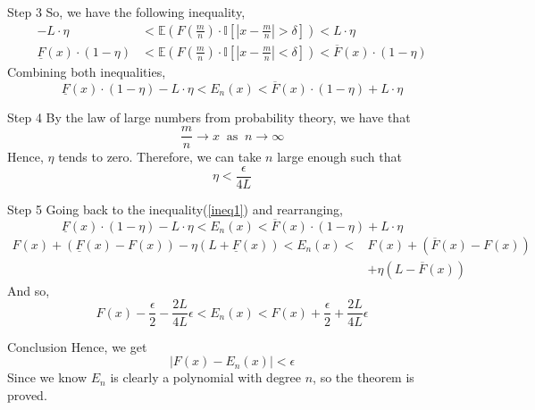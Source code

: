 \documentclass[mathserif,serif]{beamer}
\begin{document}
\begin{frame}{Step 3}
So, we have the following inequality,
\begin{align*}
    -L\cdot\eta&<\mathbb{E}\left(F\left(\frac{m}{n}\right)\cdot \mathbb{I}\left[|x-\frac{m}{n}|>\delta\right]\right)<L\cdot\eta\\
    \underline{F}(x)\cdot(1-\eta)&<\mathbb{E}\left(F\left(\frac{m}{n}\right)\cdot \mathbb{I}\left[|x-\frac{m}{n}|<\delta\right]\right)<\overline{F}(x)\cdot (1-\eta)
\end{align*}
Combining both inequalities, 
\begin{equation}\label{ineq1}
 \underline{F}(x)\cdot(1-\eta)-L\cdot\eta<E_n(x)<\overline{F}(x)\cdot (1-\eta)+L\cdot\eta 
\end{equation}
\end{frame}

\begin{frame}{Step 4}
By the law of large numbers from probability theory, we have that
\begin{equation*}
    \frac{m}{n}\longrightarrow x \;\;\text{as}\;\;n \rightarrow \infty
\end{equation*}
Hence, $\eta$ tends to zero.
\newline
Therefore, we can take $n$ large enough such that 
\begin{equation*}
\eta<\frac{\epsilon}{4L}
\end{equation*}
\end{frame}

\begin{frame}{Step 5}
Going back to the inequality(\ref{ineq1}) and rearranging,
\begin{equation*}
 \underline{F}(x)\cdot(1-\eta)-L\cdot\eta<E_n(x)<\overline{F}(x)\cdot (1-\eta)+L\cdot\eta 
\end{equation*}
\begin{align*}
    F(x)+(\underline{F}(x)-F(x))-\eta(L+\underline{F}(x))<E_n(x)< &F(x)+(\overline{F}(x)-F(x))\\
    &+\eta(L-\overline{F}(x))
\end{align*}
And so,
\begin{equation*}
    F(x)-\frac{\epsilon}{2}-\frac{2L}{4L}\epsilon<E_n(x)<F(x)+\frac{\epsilon}{2}+\frac{2L}{4L}\epsilon
\end{equation*}
\end{frame}

\begin{frame}{Conclusion}
Hence, we get
\begin{equation*}
    |F(x)-E_n(x)|<\epsilon
\end{equation*}
Since we know $E_n$ is clearly a polynomial with degree $n$, so the theorem is proved.
\end{frame}
\end{document}
